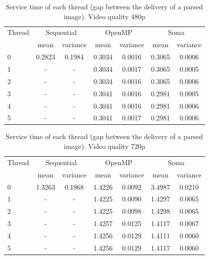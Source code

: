 \documentclass[a4paper,12pt,oneside]{book}
\begin{document}
\begin{table}
\begin{center}
\begin{tabular}{| l || c | c || c | c || c | c |} 
\hline
  Thread & \multicolumn{2}{|c||}{Sequential} & \multicolumn{2}{|c||}{OpenMP} & \multicolumn{2}{|c|}{Soma} \\
\cline{2-7}
& mean & variance & mean & variance & mean & variance \\
\cline{2-7}
\hline
0 & 0.2823 & 0.1984 & 0.3034 & 0.0016 & 0.3065 & 0.0006  \\
\hline
1 & - & - & 0.3034 & 0.0017 & 0.3065 & 0.0005 \\
\hline
2 & - & - & 0.3034 & 0.0016 & 0.3065 & 0.0006 \\
\hline 
3 & - & - & 0.3041 & 0.0016 & 0.2981 & 0.0005 \\
\hline
4 & - & - & 0.3041 & 0.0016 & 0.2981 & 0.0006 \\
\hline
5 & - & - & 0.3041 & 0.0017 & 0.2981 &  0.0006       \\
\hline
\end{tabular}
\caption{Service time of each thread (gap between the delivery of a parsed image). Video quality 480p}
\label{times}
\end{center}
\end{table}


\begin{table}
\begin{center}
\begin{tabular}{| l || c | c || c | c || c | c |} 
\hline
  Thread & \multicolumn{2}{|c||}{Sequential} & \multicolumn{2}{|c||}{OpenMP} & \multicolumn{2}{|c|}{Soma} \\
\cline{2-7}
& mean & variance & mean & variance & mean & variance \\
\cline{2-7}
\hline
0 & 1.3263 & 0.1968 & 1.4226 & 0.0092 & 3.4987 & 0.0210  \\
\hline
1 & - & - & 1.4225 & 0.0090 & 1.4297 & 0.0065 \\
\hline
2 & - & - & 1.4225 & 0.0098 & 1.4298 & 0.0065 \\
\hline 
3 & - & - & 1.4257 & 0.0125 & 1.4117 & 0.0067 \\
\hline
4 & - & - & 1.4256 & 0.0129 & 1.4111 & 0.0060 \\
\hline
5 & - & - & 1.4256 & 0.0129 & 1.4117 & 0.0060  \\
\hline
\end{tabular}
\caption{Service time of each thread (gap between the delivery of a parsed image). Video quality 720p}
\label{times}
\end{center}
\end{table}
\end{document}
